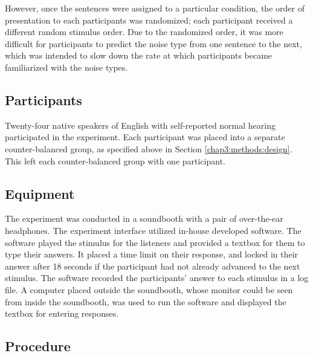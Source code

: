However, once the sentences were assigned to a particular condition, the order of presentation to each participants was randomized; each participant received a different random stimulus order.  Due to the randomized order, it was more difficult for participants to predict the noise type from one sentence to the next, which was intended to slow down the rate at which participants became familiarized with the noise types.

\subsection{Participants}
\label{chap3:methods:participants}

Twenty-four native speakers of English with self-reported normal hearing participated in the experiment. \DIFaddbegin {}\DIFaddend Each participant was placed into a separate counter-balanced group, as specified above in Section \ref{chap3:methods:design}.  This left each counter-balanced group with one participant.

\subsection{Equipment}
\label{chap3:methods:equipment}

The experiment was conducted in a soundbooth with a pair of over-the-ear headphones.  The experiment interface utilized in-house developed software.  The software played the stimulus for the listeners and provided a textbox for them to type their answers.  It placed a time limit on their response, and locked in their answer after 18 seconds if the participant had not already advanced to the next stimulus. The software recorded the participants' answer to each stimulus in a log file.  A computer placed outside the soundbooth, whose monitor could be seen from inside the soundbooth, was used to run the software and displayed the textbox for entering responses.

\subsection{Procedure}
\label{chap3:methods:procedure}

